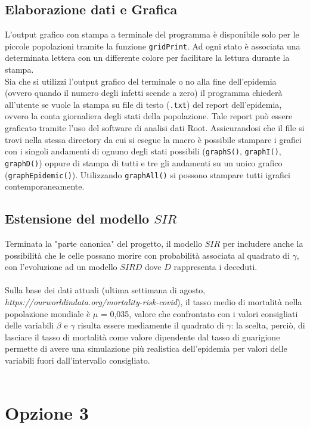 \documentclass[a4paper]{article}
\begin{document}
\subsection{Elaborazione dati e Grafica}
L'output grafico con stampa a terminale del programma è disponibile solo per le piccole popolazioni tramite la funzione \texttt{gridPrint}. Ad ogni stato è associata una determinata lettera con un differente colore per facilitare la lettura durante la stampa. \\
Sia che si utilizzi l'output grafico del terminale o no alla fine dell'epidemia (ovvero quando il numero degli infetti scende a zero) il programma chiederà all'utente se vuole la stampa su file di testo (\texttt{.txt}) del report dell'epidemia, ovvero la conta giornaliera degli stati della popolazione. Tale report può essere graficato tramite l'uso del software di analisi dati Root. Assicurandosi che il file si trovi nella stessa directory da cui si esegue la macro è possibile stampare i grafici con i singoli andamenti di ognuno degli stati possibili (\texttt{graphS()}, \texttt{graphI()}, \texttt{graphD()}) oppure di stampa di tutti e tre gli andamenti su un unico grafico (\texttt{graphEpidemic()}). Utilizzando \texttt{graphAll()} si possono stampare tutti igrafici contemporaneamente.
\subsection{Estensione del modello $SIR$}
Terminata la "parte canonica" del progetto, il modello $SIR$ per includere anche la possibilità che le celle possano morire con probabilità associata al quadrato di $\gamma$, con l'evoluzione ad un modello $SIRD$ dove $D$ rappresenta i deceduti.\\ \\ Sulla base dei dati attuali (ultima settimana di agosto,\\ \textit{https://ourworldindata.org/mortality-risk-covid}), il tasso medio di mortalità nella popolazione mondiale è $\mu$ = 0,035, valore che confrontato con i valori consigliati delle variabili $\beta$ e $\gamma$ risulta essere mediamente il quadrato di $\gamma$: la scelta, perciò, di lasciare il tasso di mortalità come valore dipendente dal tasso di guarigione permette di avere una simulazione più realistica dell'epidemia per valori delle variabili fuori dall'intervallo consigliato. 
\\ \\


\section{Opzione 3}
\end{document}

